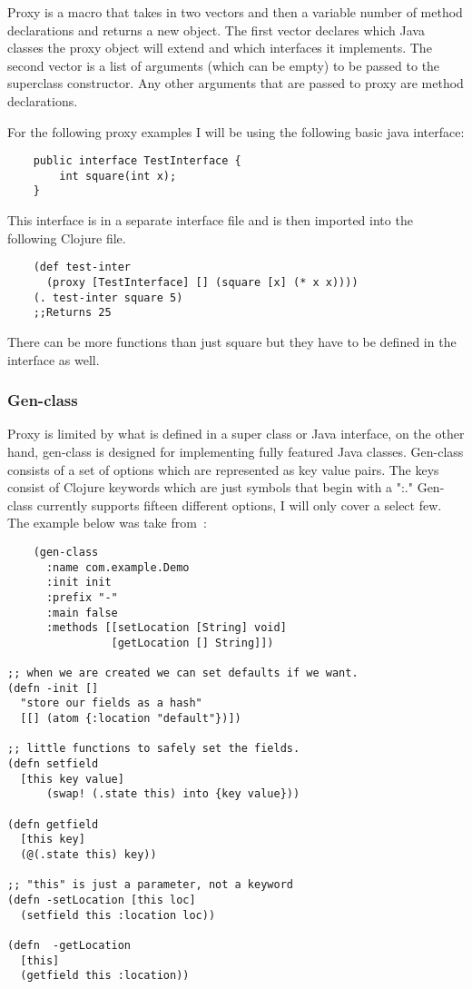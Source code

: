 \documentclass[12pt]{article}
\begin{document}
	Proxy is a macro that takes in two vectors and then a variable number of method declarations and returns a new object. The first vector declares which Java classes the proxy object will extend and which interfaces it implements. The second vector is a list of arguments (which can be empty) to be passed to the superclass constructor. Any other arguments that are passed to proxy are method declarations\cite{cloj:interop}. 
	
	For the following proxy examples I will be using the following basic java interface:
	
	\begin{verbatim}
	public interface TestInterface {
		int square(int x);
	}
	\end{verbatim}
	This interface is in a separate interface file and is then imported into the following Clojure file.
	\begin{verbatim}
	(def test-inter 
	  (proxy [TestInterface] [] (square [x] (* x x))))
	(. test-inter square 5)
	;;Returns 25
	\end{verbatim}
	There can be more functions than just square but they have to be defined in the interface as well.
	
	\subsubsection{Gen-class}
	Proxy is limited by what is defined in a super class or Java interface, on the other hand, gen-class is designed for implementing fully featured Java classes. Gen-class consists of a set of options which are represented as key value pairs. The keys consist of Clojure keywords which are just symbols that begin with a ":." Gen-class currently supports fifteen different options, I will only cover a select few. The example below was take from~\cite{docs:genClass}:
	
	\begin{verbatim}
	(gen-class
      :name com.example.Demo
      :init init
      :prefix "-"
      :main false
      :methods [[setLocation [String] void]
                [getLocation [] String]])

;; when we are created we can set defaults if we want.
(defn -init []
  "store our fields as a hash"
  [[] (atom {:location "default"})])

;; little functions to safely set the fields.
(defn setfield
  [this key value]
      (swap! (.state this) into {key value}))

(defn getfield
  [this key]
  (@(.state this) key))

;; "this" is just a parameter, not a keyword
(defn -setLocation [this loc]
  (setfield this :location loc))

(defn  -getLocation
  [this]
  (getfield this :location))
	\end{verbatim}
	
\end{document}
